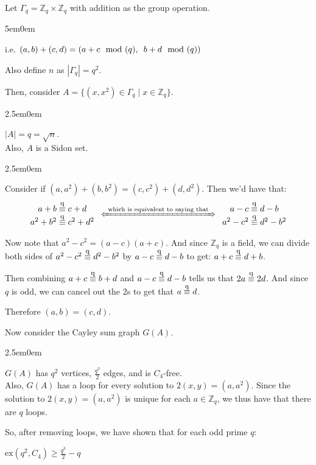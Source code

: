 \documentclass{book}
\newcommand{\hTwo}{%
   \color{MidnightBlue}%
   \fontsize{13}{15}\selectfont%
}
\newcommand{\hThree}{%
   \color{PineGreen}
   \fontsize{13}{15}\selectfont%
}
\newcommand{\myComment}{%
   \color{RawerSienna}%
   \fontsize{12}{14}\selectfont%
}
\newenvironment{myIndent}{%
   \begin{adjustwidth}{2.5em}{0em}%
}{%
   \end{adjustwidth}%
}
\newenvironment{myDindent}{%
   \begin{adjustwidth}{5em}{0em}%
}{%
   \end{adjustwidth}%
}
\newcommand{\exNums}[1]{\mathrm{ex}(#1)}
\newcommand{\myHS}{ \hspace{0.5em}}
\newcommand{\myequiv}[1]{\stackrel{\mathclap{\normalfont\mbox{\footnotesize#1}}}{\equiv}}
\newcommand{\retTwo}{\hfill\bigbreak}
\begin{document}
Let $\Gamma_q = \mathbb{Z}_q \times \mathbb{Z}_q$ with addition as the group operation.
{\begin{myDindent} \myComment
   i.e. $(a, b) + (c, d) = (a + c \mod{(q)}, \myHS b + d \mod{(q)})$ \retTwo
\end{myDindent}}

Also define $n$ as $|\Gamma_q| = q^2$.\retTwo

Then, consider $A = \{(x, x^2) \in \Gamma_q \mid x \in \mathbb{Z}_q\}$. 
{\begin{myIndent} \hTwo
   $|A| = q = \sqrt{n}$.\\
   Also, $A$ is a Sidon set.
   {\begin{myIndent} \hThree
      Consider if $(a, a^2) + (b, b^2) = (c, c^2) + (d, d^2)$. Then we'd have that:
      \[\begin{matrix}
         a + b \myequiv{q} c + d \\
         a^2 + b^2 \myequiv{q} c^2 + d^2
      \end{matrix} \myHS \xLeftrightarrow{\text{ which is equivalent to saying that }} \myHS \begin{matrix}
         a - c \myequiv{q} d - b \\
         a^2 - c^2 \myequiv{q} d^2 - b^2
      \end{matrix}\]

      Now note that $a^2 - c^2 = (a - c)(a + c)$. And since $\mathbb{Z}_q$ is a field, we can divide both sides of $a^2 - c^2 \myequiv{q} d^2 - b^2$ by $a - c \myequiv{q} d - b$ to get: $ a + c \myequiv{q} d + b$.
      \retTwo

      Then combining $a + c \myequiv{q} b + d$ and $a - c \myequiv{q} d - b$ tells us that $2a \myequiv{q} 2d$. And since $q$ is odd, we can cancel out the $2$s to get that $a \myequiv{q} d$. \retTwo

      Therefore $(a, b) = (c, d)$. \retTwo
   \end{myIndent}}
\end{myIndent}}

Now consider the Cayley sum graph $G(A)$.
{\begin{myIndent}\hTwo
   $G(A)$ has $q^2$ vertices, $\frac{q^3}{2}$ edges, and is $C_4$-free.\\
   Also, $G(A)$ has a loop for every solution to $2(x, y) = (a, a^2)$. Since the solution to $2(x, y) = (a, a^2)$ is unique for each $a \in \mathbb{Z}_q$, we thus have that there are $q$ loops. \retTwo

   So, after removing loops, we have shown that for each odd prime $q$:

   {\center $\exNums{q^2, C_4} \geq \frac{q^3}{2} - q$ \par}
\end{myIndent}}
\end{document}

